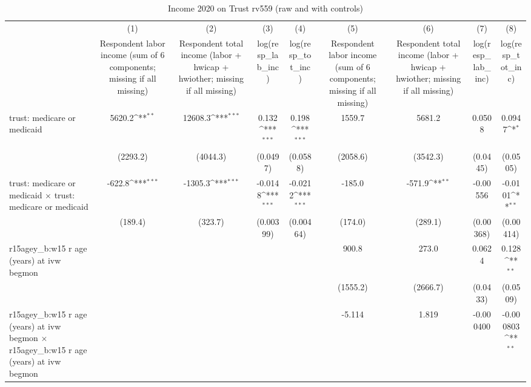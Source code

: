 \begin{table}[htbp]\centering
\def\sym#1{\ifmmode^{#1}\else\(^{#1}\)\fi}
\caption{Income 2020 on Trust rv559 (raw and with controls)}
\begin{tabular}{l*{8}{c}}
\toprule
                &\multicolumn{1}{c}{(1)}&\multicolumn{1}{c}{(2)}&\multicolumn{1}{c}{(3)}&\multicolumn{1}{c}{(4)}&\multicolumn{1}{c}{(5)}&\multicolumn{1}{c}{(6)}&\multicolumn{1}{c}{(7)}&\multicolumn{1}{c}{(8)}\\
                &\multicolumn{1}{c}{Respondent labor income (sum of 6 components; missing if all missing)}&\multicolumn{1}{c}{Respondent total income (labor + hwicap + hwiother; missing if all missing)}&\multicolumn{1}{c}{log(resp\_lab\_inc)}&\multicolumn{1}{c}{log(resp\_tot\_inc)}&\multicolumn{1}{c}{Respondent labor income (sum of 6 components; missing if all missing)}&\multicolumn{1}{c}{Respondent total income (labor + hwicap + hwiother; missing if all missing)}&\multicolumn{1}{c}{log(resp\_lab\_inc)}&\multicolumn{1}{c}{log(resp\_tot\_inc)}\\
\midrule
trust: medicare or medicaid&   5620.2\sym{**} &  12608.3\sym{***}&    0.132\sym{***}&    0.198\sym{***}&   1559.7         &   5681.2         &   0.0508         &   0.0947\sym{*}  \\
                & (2293.2)         & (4044.3)         & (0.0497)         & (0.0588)         & (2058.6)         & (3542.3)         & (0.0445)         & (0.0505)         \\
\addlinespace
trust: medicare or medicaid $\times$ trust: medicare or medicaid&   -622.8\sym{***}&  -1305.3\sym{***}&  -0.0148\sym{***}&  -0.0212\sym{***}&   -185.0         &   -571.9\sym{**} & -0.00556         &  -0.0101\sym{**} \\
                &  (189.4)         &  (323.7)         &(0.00399)         &(0.00464)         &  (174.0)         &  (289.1)         &(0.00368)         &(0.00414)         \\
\addlinespace
r15agey\_b:w15 r age (years) at ivw begmon&                  &                  &                  &                  &    900.8         &    273.0         &   0.0624         &    0.128\sym{**} \\
                &                  &                  &                  &                  & (1555.2)         & (2666.7)         & (0.0433)         & (0.0509)         \\
\addlinespace
r15agey\_b:w15 r age (years) at ivw begmon $\times$ r15agey\_b:w15 r age (years) at ivw begmon&                  &                  &                  &                  &   -5.114         &    1.819         &-0.000400         &-0.000803\sym{**} \\

\end{tabular}
\end{table}
